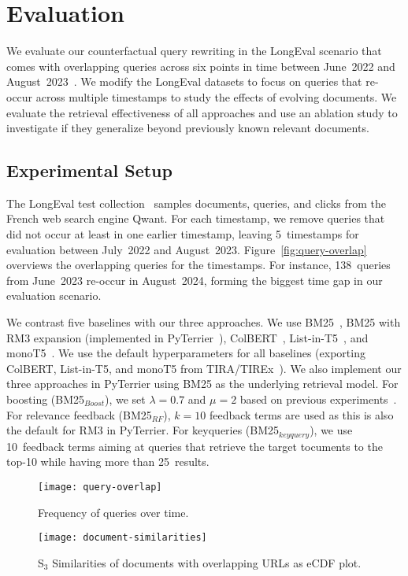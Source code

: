 \section{Evaluation}

We evaluate our counterfactual query rewriting in the LongEval scenario that comes with overlapping queries across six points in time between June~2022 and August~2023~\cite{alkhalifa:2023,alkhalifa:2024,galuscakova:2023}. We modify the LongEval datasets to focus on queries that re-occur across multiple timestamps to study the effects of evolving documents. We evaluate the retrieval effectiveness of all approaches and use an ablation study to investigate if they generalize beyond previously known relevant documents.

\subsection{Experimental Setup}
The LongEval test collection~\cite{galuscakova:2023} samples documents, queries, and clicks from the French web search engine Qwant. For each timestamp, we remove queries that did not occur at least in one earlier timestamp, leaving 5~time\-stamps for evaluation between July~2022 and August~2023. Figure~\ref{fig:query-overlap} overviews the overlapping queries for the timestamps. For instance, 138~queries from June~2023 re-occur in August~2024, forming the biggest time gap in our evaluation scenario.

We contrast five baselines with our three approaches. We use BM25~\cite{robertson:1994}, BM25 with RM3 expansion (implemented in PyTerrier~\cite{macdonald:2020}), ColBERT~\cite{khattab:2020}, List-in-T5~\cite{tamber:2023}, and monoT5~\cite{nogueira:2020}. We use the default hyperparameters for all baselines (exporting ColBERT, List-in-T5, and monoT5 from TIRA/TIREx~\cite{froebe:2023e,froebe:2023b}). We also implement our three approaches in PyTerrier using BM25 as the underlying retrieval model. For boosting (BM25$_{Boost}$), we set $\lambda=0.7$ and $\mu=2$ based on previous experiments~\cite{keller:2024b}. For relevance feedback (BM25$_{RF}$), $k=10$ feedback terms are used as this is also the default for RM3 in PyTerrier. For keyqueries (BM25$_{keyquery}$), we use 10~feedback terms aiming at queries that retrieve the target tocuments to the top-10 while having more than 25~results.

\begin{figure}[t]
    \begin{minipage}{.49\textwidth}
        \texttt{[image: query-overlap]}
        \vspace{-4ex}
        \caption{Frequency of queries over time.}
        \label{fig:query-overlap}
    \end{minipage}
    \hfill    
    \begin{minipage}{.49\textwidth}
        \texttt{[image: document-similarities]}
        \vspace{-4ex}
        \caption{S$_{3}$ Similarities of documents with overlapping URLs as eCDF plot.}
        \label{fig:document-similarities}
    \end{minipage}
\end{figure}

